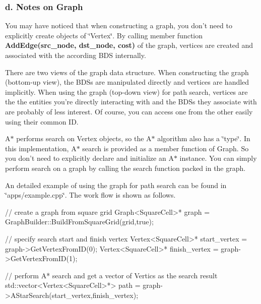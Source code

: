 \subsubsection*{d. Notes on Graph}


\begin{DoxyItemize}
\item You may have noticed that when constructing a graph, you don't need to explicitly create objects of \char`\"{}\-Vertex\char`\"{}. By calling member function {\bfseries Add\-Edge(src\-\_\-node, dst\-\_\-node, cost)} of the graph, vertices are created and associated with the according B\-D\-S internally.
\item There are two views of the graph data structure. When constructing the graph (bottom-\/up view), the B\-D\-Ss are manipulated directly and vertices are handled implicitly. When using the graph (top-\/down view) for path search, vertices are the the entities you're directly interacting with and the B\-D\-Ss they associate with are probably of less interest. Of course, you can access one from the other easily using their common I\-D.
\item A$\ast$ performs search on Vertex objects, so the A$\ast$ algorithm also has a \char`\"{}type\char`\"{}. In this implementation, A$\ast$ search is provided as a member function of Graph. So you don't need to explicitly declare and initialize an A$\ast$ instance. You can simply perform search on a graph by calling the search function packed in the graph.
\item An detailed example of using the graph for path search can be found in \char`\"{}apps/example.\-cpp\char`\"{}. The work flow is shown as follows.
\end{DoxyItemize}


\begin{DoxyCode}
\textcolor{comment}{// create a graph from square grid}
Graph<SquareCell>* graph = GraphBuilder::BuildFromSquareGrid(grid,\textcolor{keyword}{true});

\textcolor{comment}{// specify search start and finish vertex}
Vertex<SquareCell>* start\_vertex = graph->GetVertexFromID(0);
Vertex<SquareCell>* finish\_vertex = graph->GetVertexFromID(1);

\textcolor{comment}{// perform A* search and get a vector of Vertics as the search result}
std::vector<Vertex<SquareCell>*> path = graph->AStarSearch(start\_vertex,finish\_vertex);
\end{DoxyCode}
 